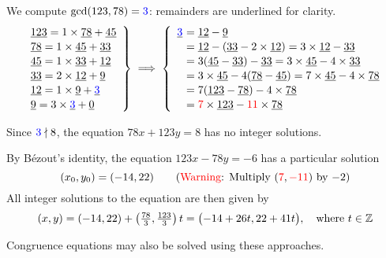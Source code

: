 \begin{example}{}{}
	We compute $\gcd(123,78) =\textcolor{blue}{3}$: remainders are underlined for clarity.
  \[\def\arraystretch{1.1}
  \def\ul#1{\underline{#1}}
  \left.\begin{array}{l}
	\ul{123}=1\times \ul{78}+\ul{45}\\
	\ul{78}=1\times \ul{45}+\ul{33}\\
	\ul{45}=1\times \ul{33}+\ul{12}\\
	\ul{33}=2\times \ul{12}+\ul 9\\
	\ul{12}=1\times \ul 9+\ul{\textcolor{blue}{3}}\\
	\ul 9=3\times \ul{\textcolor{blue}{3}}+\ul 0
  \end{array}\right\}
  \implies
  \left\{\begin{array}{r@{\,\,}l}
	\ul{\textcolor{blue}{3}}&=\ul{12}-\ul 9\\
	&=\ul{12}-(\ul{33}-2\times \ul{12}) =3\times \ul{12}-\ul{33}\\
	&=3(\ul{45}-\ul{33})-\ul{33} =3\times \ul{45}-4\times \ul{33}\\
	&=3\times \ul{45}-4(\ul{78}-\ul{45}) =7\times \ul{45}-4\times \ul{78}\\
	&=7(\ul{123}-\ul{78})-4\times \ul{78}\\
  &=\textcolor{red}{7}\times \ul{123}-\textcolor{red}{11}\times \ul{78}
  \end{array}\right.
  \]
  \begin{enumeratea}
  	\item Since $\textcolor{blue}{3}\nmid 8$, the equation $78x+123y=8$ has no integer solutions.
  	\item By Bézout's identity, the equation $123x-78y=-6$ has a particular solution
  	\[
  		(x_0,y_0)=(-14,22) \tag{\textcolor{red}{Warning}: Multiply $(\textcolor{red}{7},\textcolor{red}{-11})$ by $-2$}
  	\]
  	All integer solutions to the equation are then given by
  	\[
  		(x,y)=(-14,22)+\left(\tfrac{78}3,\tfrac{123}3\right)t=\bigl(-14+26t,22+41t\bigr),\quad\text{where }t\in\mathbb{Z}
  	\]
	\end{enumeratea}
\end{example}



Congruence equations may also be solved using these approaches.

